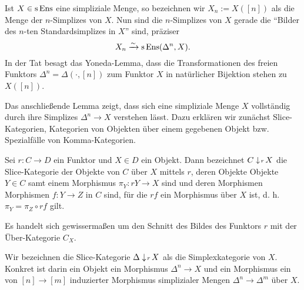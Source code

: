 Ist $X \in \operatorname{s}\operatorname{Ens}$ eine simpliziale Menge, so bezeichnen wir $X_n :=
X([n])$ als die Menge der $n$-Simplizes von $X$. Nun sind die
$n$-Simplizes von $X$ gerade die ``Bilder des $n$-ten
Standardsimplizes in $X$'' sind, präziser
\begin{equation} \label{eq:simp-as-hom}
X_n \xrightarrow[]{\sim} \operatorname{s}\operatorname{Ens}(\Delta^n, X).
\end{equation}
In der Tat besagt das Yoneda-Lemma, dass die Transformationen des
freien Funktors $\Delta^n = \Delta(\cdot, [n])$ zum Funktor $X$ in
natürlicher Bijektion stehen zu $X([n])$.

Das anschließende Lemma zeigt, dass sich eine simpliziale Menge $X$
vollständig durch ihre Simplizes $\Delta^n \to X$ verstehen
lässt. Dazu erklären wir zunächst Slice-Kategorien, Kategorien von
Objekten über einem gegebenen Objekt bzw. Spezialfälle von
Komma-Kategorien.
\begin{defn}
  Sei $r: C \to D$ ein Funktor und $X \in D$ ein Objekt. Dann
  bezeichnet $C \downarrow \! {\scriptstyle r} \, X$ die Slice-Kategorie der Objekte von
  $C$ über $X$ mittels $r$, deren Objekte Objekte $Y \in C$ samt einem
  Morphismus $\pi_Y: rY \to X$ sind und deren Morphismen Morphismen
  $f: Y \to Z$ in $C$ sind, für die $rf$ ein Morphismus über $X$ ist,
  d. h. $\pi_Y = \pi_Z \circ rf$ gilt.
\end{defn}
Es handelt sich gewissermaßen um den Schnitt des Bildes des Funktors
$r$ mit der Über-Kategorie $C_X$.

Wir bezeichnen die Slice-Kategorie $\Delta \downarrow \! {\scriptstyle r} \, X$ als die
Simplexkategorie von $X$. Konkret ist darin ein Objekt ein Morphismus
$\Delta^n \to X$ und ein Morphismus ein von $[n] \to [m]$ induzierter
Morphismus simplizialer Mengen $\Delta^n \to \Delta^m$ über $X$.

